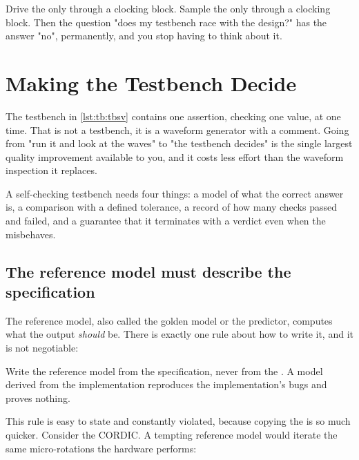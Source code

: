 \begin{ruleofthumb}
Drive the \DUT{} only through a clocking block. Sample the \DUT{} only through
a clocking block. Then the question "does my testbench race with the design?"
has the answer "no", permanently, and you stop having to think about it.
\end{ruleofthumb}

\section{Making the Testbench Decide}
\label{sec:tb:selfcheck}

The testbench in \cref{lst:tb:tbsv} contains one
assertion, checking one value, at one time. That is not a testbench, it is a
waveform generator with a comment. Going from "run it and look at the waves" to
"the testbench decides" is the single largest quality improvement available to
you, and it costs less effort than the waveform inspection it replaces.

A self-checking testbench needs four things: a model of what the correct answer
is, a comparison with a defined tolerance, a record of how many checks passed
and failed, and a guarantee that it terminates with a verdict even when the
\DUT{} misbehaves.

\subsection{The reference model must describe the specification}

The reference model, also called the
golden model or the predictor, computes what the output \emph{should} be. There
is exactly one rule about how to write it, and it is not negotiable:

\begin{ruleofthumb}
Write the reference model from the specification, never from the \RTL{}. A
model derived from the implementation reproduces the implementation's bugs and
proves nothing.
\end{ruleofthumb}

This rule is easy to state and constantly violated, because copying the \RTL{}
is so much quicker. Consider the CORDIC. A tempting reference model would
iterate the same micro-rotations the hardware performs:

